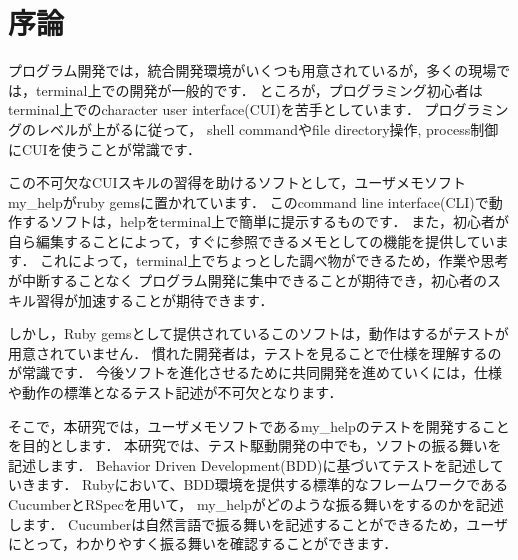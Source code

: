\section{序論}
プログラム開発では，統合開発環境がいくつも用意されているが，多くの現場では，terminal上での開発が一般的です．
ところが，プログラミング初心者はterminal上でのcharacter user interface(CUI)を苦手としています．
プログラミングのレベルが上がるに従って，
shell commandやfile directory操作, process制御にCUIを使うことが常識です．

この不可欠なCUIスキルの習得を助けるソフトとして，ユーザメモソフトmy\_helpがruby gemsに置かれています．
このcommand line interface(CLI)で動作するソフトは，helpをterminal上で簡単に提示するものです．
また，初心者が自ら編集することによって，すぐに参照できるメモとしての機能を提供しています．
これによって，terminal上でちょっとした調べ物ができるため，作業や思考が中断することなく
プログラム開発に集中できることが期待でき，初心者のスキル習得が加速することが期待できます．

しかし，Ruby gemsとして提供されているこのソフトは，動作はするがテストが用意されていません．
慣れた開発者は，テストを見ることで仕様を理解するのが常識です．
今後ソフトを進化させるために共同開発を進めていくには，仕様や動作の標準となるテスト記述が不可欠となります．

そこで，本研究では，ユーザメモソフトであるmy\_helpのテストを開発することを目的とします．
本研究では、テスト駆動開発の中でも，ソフトの振る舞いを記述します．
Behavior Driven Development(BDD)に基づいてテストを記述していきます．
Rubyにおいて、BDD環境を提供する標準的なフレームワークであるCucumberとRSpecを用いて，
my\_helpがどのような振る舞いをするのかを記述します．
Cucumberは自然言語で振る舞いを記述することができるため，ユーザにとって，わかりやすく振る舞いを確認することができます．

